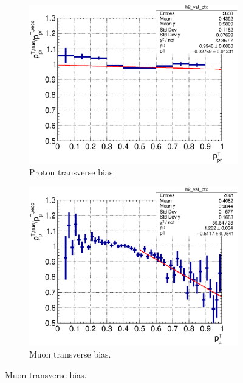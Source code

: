        \begin{figure}[!htb]
           \centering
           \begin{subfigure}{0.3\textwidth}
                \includegraphics[width=\textwidth]{figures/pr_pt_vs_pr_pt_bias_hist2d_al14.eps}
                \caption{Proton transverse bias.}
                \label{fig:0pi-prpt-bias}
           \end{subfigure}
           \begin{subfigure}{0.3\textwidth}
                \includegraphics[width=\textwidth]{figures/mu_pt_vs_mu_pt_bias_hist2d_al14.eps}
                \caption{Muon transverse bias.}
                \label{fig:0pi-mupt-bias}
           \end{subfigure}

\end{figure}
